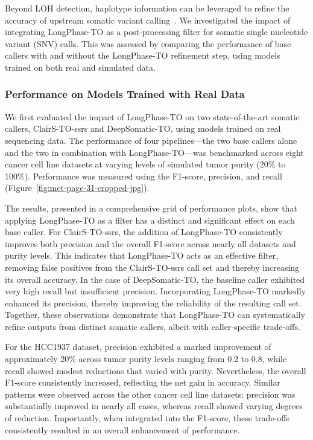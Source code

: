 \documentclass[pdflatex,sn-nature]{sn-jnl}
\begin{document}
Beyond LOH detection, haplotype information can be leveraged to refine the accuracy of upstream somatic variant calling~\cite{zhou2024}. We investigated the impact of integrating LongPhase-TO as a post-processing filter for somatic single nucleotide variant (SNV) calls. This was assessed by comparing the performance of base callers with and without the LongPhase-TO refinement step, using models trained on both real and simulated data.

\subsubsection{Performance on Models Trained with Real Data}\label{performance-on-models-trained-with-real-data}

We first evaluated the impact of LongPhase-TO on two state-of-the-art somatic callers, ClairS-TO-ssrs and DeepSomatic-TO, using models trained on real sequencing data. The performance of four pipelines—the two base callers alone and the two in combination with LongPhase-TO—was benchmarked across eight cancer cell line datasets at varying levels of simulated tumor purity (20\% to 100\%). Performance was measured using the F1-score, precision, and recall (Figure~\ref{fig:met-page-31-cropped-jpg}).

The results, presented in a comprehensive grid of performance plots, show that applying LongPhase-TO as a filter has a distinct and significant effect on each base caller. For ClairS-TO-ssrs, the addition of LongPhase-TO consistently improves both precision and the overall F1-score across nearly all datasets and purity levels. This indicates that LongPhase-TO acts as an effective filter, removing false positives from the ClairS-TO-ssrs call set and thereby increasing its overall accuracy. In the case of DeepSomatic-TO, the baseline caller exhibited very high recall but insufficient precision. Incorporating LongPhase-TO markedly enhanced its precision, thereby improving the reliability of the resulting call set. Together, these observations demonstrate that LongPhase-TO can systematically refine outputs from distinct somatic callers, albeit with caller-specific trade-offs.

For the HCC1937 dataset, precision exhibited a marked improvement of approximately 20\% across tumor purity levels ranging from 0.2 to 0.8, while recall showed modest reductions that varied with purity. Nevertheless, the overall F1-score consistently increased, reflecting the net gain in accuracy. Similar patterns were observed across the other cancer cell line datasets: precision was substantially improved in nearly all cases, whereas recall showed varying degrees of reduction. Importantly, when integrated into the F1-score, these trade-offs consistently resulted in an overall enhancement of performance.
\end{document}
